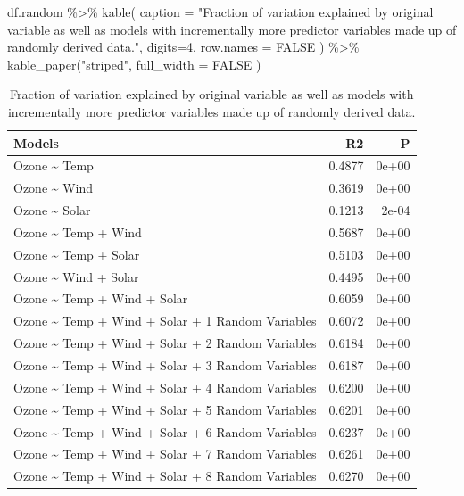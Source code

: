 \documentclass[
  letterpaper,
]{book}
\newenvironment{Shaded}{\begin{snugshade}}{\end{snugshade}}
\newcommand{\AttributeTok}[1]{\textcolor[rgb]{0.40,0.45,0.13}{#1}}
\newcommand{\ConstantTok}[1]{\textcolor[rgb]{0.56,0.35,0.01}{#1}}
\newcommand{\DecValTok}[1]{\textcolor[rgb]{0.68,0.00,0.00}{#1}}
\newcommand{\FunctionTok}[1]{\textcolor[rgb]{0.28,0.35,0.67}{#1}}
\newcommand{\NormalTok}[1]{\textcolor[rgb]{0.00,0.23,0.31}{#1}}
\newcommand{\SpecialCharTok}[1]{\textcolor[rgb]{0.37,0.37,0.37}{#1}}
\newcommand{\StringTok}[1]{\textcolor[rgb]{0.13,0.47,0.30}{#1}}
\begin{document}
\begin{Shaded}
\begin{Highlighting}[]
\NormalTok{df.random }\SpecialCharTok{\%\textgreater{}\%}
  \FunctionTok{kable}\NormalTok{( }\AttributeTok{caption =} \StringTok{"Fraction of variation explained by original variable as well as models with incrementally more predictor variables made up of randomly derived data."}\NormalTok{,}
         \AttributeTok{digits=}\DecValTok{4}\NormalTok{,}
         \AttributeTok{row.names =} \ConstantTok{FALSE}\NormalTok{ ) }\SpecialCharTok{\%\textgreater{}\%}
  \FunctionTok{kable\_paper}\NormalTok{(}\StringTok{"striped"}\NormalTok{, }\AttributeTok{full\_width =} \ConstantTok{FALSE}\NormalTok{ )}
\end{Highlighting}
\end{Shaded}

\begin{longtable}[t]{lrr}
\caption{\label{tab:unnamed-chunk-32}Fraction of variation explained by original variable as well as models with incrementally more predictor variables made up of randomly derived data.}\\
\toprule
Models & R2 & P\\
\midrule
Ozone \textasciitilde{} Temp & 0.4877 & 0e+00\\
Ozone \textasciitilde{} Wind & 0.3619 & 0e+00\\
Ozone \textasciitilde{} Solar & 0.1213 & 2e-04\\
Ozone \textasciitilde{} Temp + Wind & 0.5687 & 0e+00\\
Ozone \textasciitilde{} Temp + Solar & 0.5103 & 0e+00\\
\addlinespace
Ozone \textasciitilde{} Wind + Solar & 0.4495 & 0e+00\\
Ozone \textasciitilde{} Temp + Wind + Solar & 0.6059 & 0e+00\\
Ozone \textasciitilde{} Temp + Wind + Solar + 1 Random Variables & 0.6072 & 0e+00\\
Ozone \textasciitilde{} Temp + Wind + Solar + 2 Random Variables & 0.6184 & 0e+00\\
Ozone \textasciitilde{} Temp + Wind + Solar + 3 Random Variables & 0.6187 & 0e+00\\
\addlinespace
Ozone \textasciitilde{} Temp + Wind + Solar + 4 Random Variables & 0.6200 & 0e+00\\
Ozone \textasciitilde{} Temp + Wind + Solar + 5 Random Variables & 0.6201 & 0e+00\\
Ozone \textasciitilde{} Temp + Wind + Solar + 6 Random Variables & 0.6237 & 0e+00\\
Ozone \textasciitilde{} Temp + Wind + Solar + 7 Random Variables & 0.6261 & 0e+00\\
Ozone \textasciitilde{} Temp + Wind + Solar + 8 Random Variables & 0.6270 & 0e+00\\
\bottomrule
\end{longtable}
\end{document}

